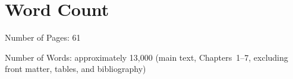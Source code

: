\chapter*{Word Count}

\vspace{1em}
\noindent Number of Pages: 61

\noindent Number of Words: approximately 13{,}000 (main text, Chapters~1--7, excluding front matter, tables, and bibliography)
